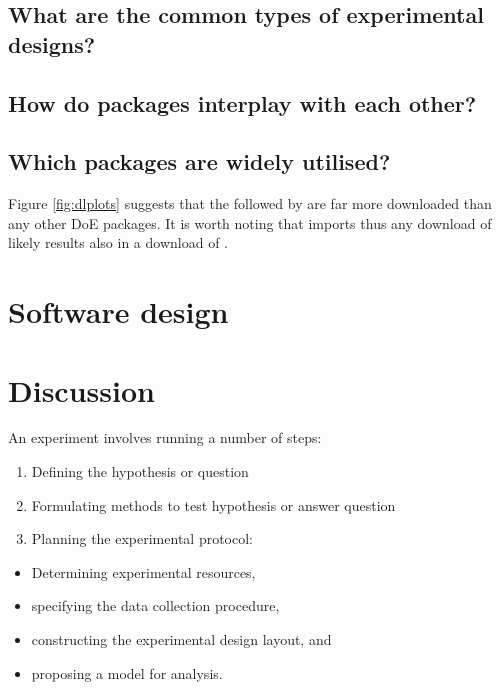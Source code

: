 \hypertarget{what-are-the-common-types-of-experimental-designs}{%
\subsection{What are the common types of experimental
designs?}\label{what-are-the-common-types-of-experimental-designs}}

\hypertarget{how-do-packages-interplay-with-each-other}{%
\subsection{How do packages interplay with each
other?}\label{how-do-packages-interplay-with-each-other}}

\hypertarget{which-packages-are-widely-utilised}{%
\subsection{Which packages are widely
utilised?}\label{which-packages-are-widely-utilised}}

Figure \ref{fig:dlplots} suggests that the  followed
by  are far more downloaded than any other DoE
packages. It is worth noting that  imports
 thus any download of  likely
results also in a download of .

\hypertarget{software-design}{%
\section{Software design}\label{software-design}}

\hypertarget{discussion}{%
\section{Discussion}\label{discussion}}

An experiment involves running a number of steps:

\begin{enumerate}
\def\labelenumi{\arabic{enumi}.}
\tightlist
\item
  Defining the hypothesis or question
\item
  Formulating methods to test hypothesis or answer question
\item
  Planning the experimental protocol:
\end{enumerate}

\begin{itemize}
\tightlist
\item
  Determining experimental resources,
\item
  specifying the data collection procedure,
\item
  constructing the experimental design layout, and
\item
  proposing a model for analysis.
\end{itemize}

